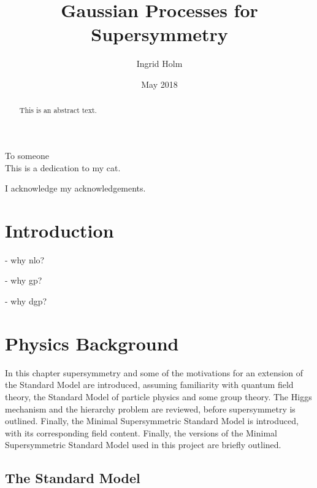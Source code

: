 \documentclass[twoside,english]{uiofysmaster}
\begin{document}
\title{Gaussian Processes for Supersymmetry}
\author{Ingrid Holm}
\date{May 2018}

\maketitle

\begin{abstract}
This is an abstract text.
\end{abstract}

\begin{dedication}
  To someone
  \\\vspace{12pt}
  This is a dedication to my cat.
\end{dedication}

\begin{acknowledgements}
  I acknowledge my acknowledgements.
\end{acknowledgements}

\tableofcontents


\chapter{Introduction}

- why nlo?

- why gp?

- why dgp?

\chapter{Physics Background}



In this chapter supersymmetry and some of the motivations for an extension of the Standard Model are introduced, assuming familiarity with quantum field theory, the Standard Model of particle physics and some group theory. The Higgs mechanism and the hierarchy problem are reviewed, before supersymmetry is outlined. Finally, the Minimal Supersymmetric Standard Model is introduced, with its corresponding field content. Finally, the versions of the Minimal Supersymmetric Standard Model used in this project are briefly outlined.

\section{The Standard Model}
\end{document}
